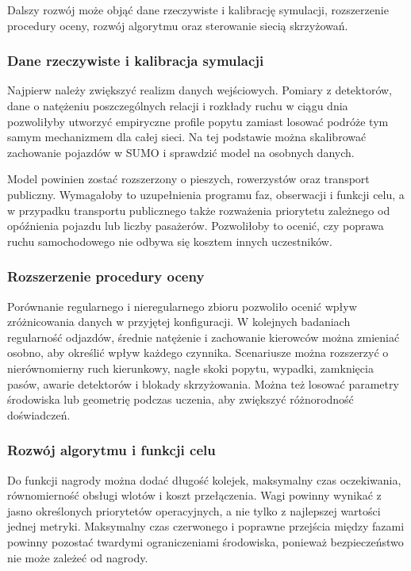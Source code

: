 Dalszy rozwój może objąć dane rzeczywiste i kalibrację symulacji, rozszerzenie procedury oceny, rozwój algorytmu oraz sterowanie siecią skrzyżowań.

\subsubsection{Dane rzeczywiste i kalibracja symulacji}

Najpierw należy zwiększyć realizm danych wejściowych. Pomiary z detektorów, dane o natężeniu poszczególnych relacji i rozkłady ruchu w ciągu dnia pozwoliłyby utworzyć empiryczne profile popytu zamiast losować podróże tym samym mechanizmem dla całej sieci. Na tej podstawie można skalibrować zachowanie pojazdów w SUMO i sprawdzić model na osobnych danych.

Model powinien zostać rozszerzony o pieszych, rowerzystów oraz transport publiczny. Wymagałoby to uzupełnienia programu faz, obserwacji i funkcji celu, a w przypadku transportu publicznego także rozważenia priorytetu zależnego od opóźnienia pojazdu lub liczby pasażerów. Pozwoliłoby to ocenić, czy poprawa ruchu samochodowego nie odbywa się kosztem innych uczestników.

\subsubsection{Rozszerzenie procedury oceny}

Porównanie regularnego i nieregularnego zbioru pozwoliło ocenić wpływ zróżnicowania danych w przyjętej konfiguracji. W kolejnych badaniach regularność odjazdów, średnie natężenie i zachowanie kierowców można zmieniać osobno, aby określić wpływ każdego czynnika. Scenariusze można rozszerzyć o nierównomierny ruch kierunkowy, nagłe skoki popytu, wypadki, zamknięcia pasów, awarie detektorów i blokady skrzyżowania. Można też losować parametry środowiska lub geometrię podczas uczenia, aby zwiększyć różnorodność doświadczeń.

\subsubsection{Rozwój algorytmu i funkcji celu}

Do funkcji nagrody można dodać długość kolejek, maksymalny czas oczekiwania, równomierność obsługi wlotów i koszt przełączenia. Wagi powinny wynikać z jasno określonych priorytetów operacyjnych, a nie tylko z najlepszej wartości jednej metryki. Maksymalny czas czerwonego i poprawne przejścia między fazami powinny pozostać twardymi ograniczeniami środowiska, ponieważ bezpieczeństwo nie może zależeć od nagrody.

